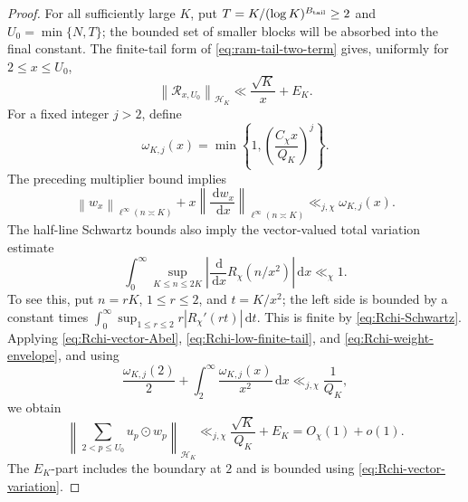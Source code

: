 \documentclass[11pt]{article}
\numberwithin{equation}{section}
\theoremstyle{definition}
\newcommand{\1}{\mathbf 1}
\newcommand{\dd}{\,\mathrm d}
\newcommand{\norm}[1]{\left\lVert#1\right\rVert}
\begin{document}
\begin{proof}
For all sufficiently large \(K\), put
\(T=K/(\log K)^{B_{\rm tail}}\ge2\) and \(U_0=\min\{N,T\}\); the bounded set
of smaller blocks will be absorbed into the final constant.  The finite-tail
form of \eqref{eq:ram-tail-two-term} gives, uniformly for
\(2\le x\le U_0\),
\begin{equation}\label{eq:Rchi-low-finite-tail}
 \norm{\mathcal R_{x,U_0}}_{\mathcal H_K}
 \ll\frac{\sqrt K}{x}+E_K.
\end{equation}
For a fixed integer \(j>2\), define
\[
 \omega_{K,j}(x)=
 \min\left\{1,\left(\frac{C_\chi x}{Q_K}\right)^j\right\}.
\]
The preceding multiplier bound implies
\begin{equation}\label{eq:Rchi-weight-envelope}
 \norm{w_x}_{\ell^\infty(n\asymp K)}+
 x\norm{\frac{\dd w_x}{\dd x}}_{\ell^\infty(n\asymp K)}
 \ll_{j,\chi}\omega_{K,j}(x).
\end{equation}
The half-line Schwartz bounds also imply the vector-valued total
variation estimate
\begin{equation}\label{eq:Rchi-vector-variation}
 \int_0^\infty\sup_{K\le n\le2K}
 \left|\frac{\dd}{\dd x}R_\chi(n/x^2)\right|\dd x\ll_\chi1.
\end{equation}
To see this, put \(n=rK\), \(1\le r\le2\), and \(t=K/x^2\); the
left side is bounded by a constant times
\(\int_0^\infty\sup_{1\le r\le2}r|R_\chi'(rt)|\dd t\).
This is finite by \eqref{eq:Rchi-Schwartz}.  Applying
\eqref{eq:Rchi-vector-Abel}, \eqref{eq:Rchi-low-finite-tail}, and
\eqref{eq:Rchi-weight-envelope}, and using
\[
 \frac{\omega_{K,j}(2)}2+
 \int_2^\infty\frac{\omega_{K,j}(x)}{x^2}\dd x
 \ll_{j,\chi}\frac1{Q_K},
\]
we obtain
\begin{equation}\label{eq:Rchi-low-Abel-bound}
 \left\|\sum_{2<p\le U_0}u_p\odot w_p\right\|_{\mathcal H_K}
 \ll_{j,\chi}\frac{\sqrt K}{Q_K}+E_K
 =O_\chi(1)+o(1).
\end{equation}
The \(E_K\)-part includes the boundary at \(2\) and is bounded using
\eqref{eq:Rchi-vector-variation}.


\end{proof}
\end{document}
